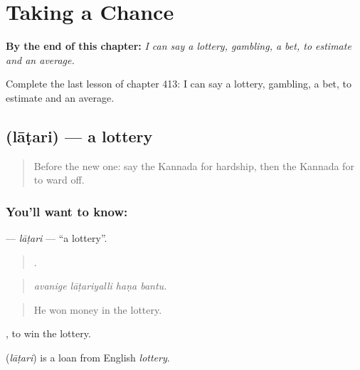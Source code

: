 
\chapter{Taking a Chance}
\label{ch:ka-taking-a-chance}

\begin{chapteropening}
\textbf{By the end of this chapter:} \emph{I can say a lottery, gambling, a bet, to estimate and an average.}

Complete the last lesson of chapter 413: I can say a lottery, gambling, a bet, to estimate and an average.
\end{chapteropening}

\section[\texorpdfstring{\kn{ಲಾಟರಿ} (lāṭari)}{ಲಾಟರಿ (lāṭari)}]{ (lāṭari) — a lottery}

\label{lesson:KA-C413-latari}



\begin{quote}
Before the new one: say the Kannada for hardship, then the Kannada for to ward off.
\end{quote}

\subsection*{You'll want to know: }
\textbf{} — \emph{lāṭari} — \textquotedblleft{}a lottery\textquotedblright{}.

\begin{quote}
   .
\end{quote}

\begin{quote}
\emph{avanige lāṭariyalli haṇa bantu.}
\end{quote}

\begin{quote}
He won money in the lottery.
\end{quote}

 , to win the lottery.

\begin{cousinweb}
\textbf{} (\emph{lāṭari}) is a loan from English \emph{lottery}.
\end{cousinweb}

